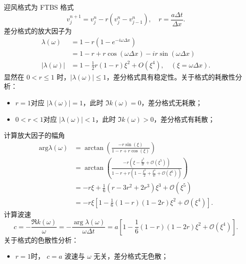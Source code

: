 \begin{solution*}
    迎风格式为 FTBS 格式
    \[
        v_j^{n+1} = v_j^n - r (v_j^n - v_{j-1}^{n}),\quad r = \frac{a \Delta t}{\Delta x}.
    \]
    差分格式的放大因子为
    \begin{align*}
        \lambda(\omega)   & = 1 - r (1 - e^{-i \omega \Delta x})                        \\
                          & = 1 - r + r \cos(\omega\Delta x) - i r \sin(\omega\Delta x) \\
        |\lambda(\omega)| & =
        1 - \frac12 r(1-r) \xi^2 + O(\xi^4),\quad (\xi = \omega \Delta x).
    \end{align*}
    显然在 $ 0< r \le 1$ 时，$|\lambda(\omega)| \le 1$，差分格式具有稳定性。关于格式的耗散性分析：
    \begin{itemize}
        \item $r=1$对应 $|\lambda(\omega)| = 1$，此时 $\Im k(\omega) = 0$，差分格式无耗散；
        \item $0<r<1$对应 $|\lambda(\omega)| < 1$，此时 $\Im k(\omega) > 0$，差分格式有耗散；
    \end{itemize}
    计算放大因子的幅角
    \begin{align*}
        \text{arg} \lambda(\omega) & =
        \arctan \left(\frac{
                - r \sin(\xi)
            }{
                1 - r + r \cos(\xi)
            }     \right)
        \\
                                   & =
        \arctan \left(\frac{
                -r (\xi - \frac{\xi^3}{3!} + \mathcal{O}(\xi^5))
            }{
                1 - r + r\left(
                1 - \frac{\xi^2}2 + \frac{\xi^4}{4!} + \mathcal{O}(\xi^6)
                \right)
        }     \right)                                                   \\
                                   & =
        - r \xi + \frac16 (r - 3r^2 + 2r^3) \xi^3 +  \mathcal{O}(\xi^5) \\
                                   & = - r\xi \left[
            1 - \frac16 (1-r)(1-2r)\xi^2 +  \mathcal{O}(\xi^4)
            \right].
    \end{align*}
    计算波速
    \[
        c = -\frac{\Re k(\omega)}{\omega} = - \frac{\arg \lambda(\omega)}{ \omega\Delta t} = a  \left[
            1 - \frac16 (1-r)(1-2r)\xi^2 +  \mathcal{O}(\xi^4)
            \right].
    \]
    关于格式的色散性分析：
    \begin{itemize}
        \item $r=1$时， $c = a$ 波速与 $\omega$ 无关，差分格式无色散；

\end{itemize}
\end{solution*}

